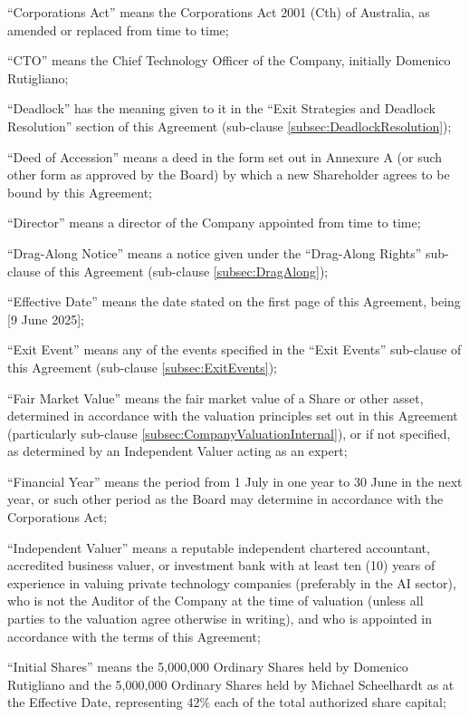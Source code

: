 ``Corporations Act'' means the Corporations Act 2001 (Cth) of Australia, as amended or replaced from time to time;

``CTO'' means the Chief Technology Officer of the Company, initially Domenico Rutigliano;

``Deadlock'' has the meaning given to it in the ``Exit Strategies and Deadlock Resolution'' section of this Agreement (sub-clause \ref{subsec:DeadlockResolution});

``Deed of Accession'' means a deed in the form set out in Annexure A (or such other form as approved by the Board) by which a new Shareholder agrees to be bound by this Agreement;

``Director'' means a director of the Company appointed from time to time;

``Drag-Along Notice'' means a notice given under the ``Drag-Along Rights'' sub-clause of this Agreement (sub-clause \ref{subsec:DragAlong});

``Effective Date'' means the date stated on the first page of this Agreement, being [9 June 2025];

``Exit Event'' means any of the events specified in the ``Exit Events'' sub-clause of this Agreement (sub-clause \ref{subsec:ExitEvents});

``Fair Market Value'' means the fair market value of a Share or other asset, determined in accordance with the valuation principles set out in this Agreement (particularly sub-clause \ref{subsec:CompanyValuationInternal}), or if not specified, as determined by an Independent Valuer acting as an expert;

``Financial Year'' means the period from 1 July in one year to 30 June in the next year, or such other period as the Board may determine in accordance with the Corporations Act;

``Independent Valuer'' means a reputable independent chartered accountant, accredited business valuer, or investment bank with at least ten (10) years of experience in valuing private technology companies (preferably in the AI sector), who is not the Auditor of the Company at the time of valuation (unless all parties to the valuation agree otherwise in writing), and who is appointed in accordance with the terms of this Agreement;

``Initial Shares'' means the 5,000,000 Ordinary Shares held by Domenico Rutigliano and the 5,000,000 Ordinary Shares held by Michael Scheelhardt as at the Effective Date, representing 42\% each of the total authorized share capital;

